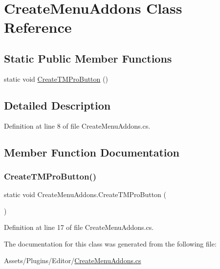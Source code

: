 \hypertarget{class_create_menu_addons}{}\section{Create\+Menu\+Addons Class Reference}
\label{class_create_menu_addons}
\subsection*{Static Public Member Functions}
\begin{DoxyCompactItemize}
\item 
static void \mbox{\hyperlink{class_create_menu_addons_a80c35aa67c01ae722d7f4df31442b8e3}{Create\+T\+M\+Pro\+Button}} ()
\end{DoxyCompactItemize}


\subsection{Detailed Description}


Definition at line 8 of file Create\+Menu\+Addons.\+cs.



\subsection{Member Function Documentation}
\mbox{\label{class_create_menu_addons_a80c35aa67c01ae722d7f4df31442b8e3}} 
\subsubsection{\texorpdfstring{Create\+T\+M\+Pro\+Button()}{CreateTMProButton()}}
{\footnotesize\ttfamily static void Create\+Menu\+Addons.\+Create\+T\+M\+Pro\+Button (\begin{DoxyParamCaption}{ }\end{DoxyParamCaption})\hspace{0.3cm}{\ttfamily [static]}}



Definition at line 17 of file Create\+Menu\+Addons.\+cs.



The documentation for this class was generated from the following file\+:\begin{DoxyCompactItemize}
\item 
Assets/\+Plugins/\+Editor/\mbox{\hyperlink{_create_menu_addons_8cs}{Create\+Menu\+Addons.\+cs}}\end{DoxyCompactItemize}
